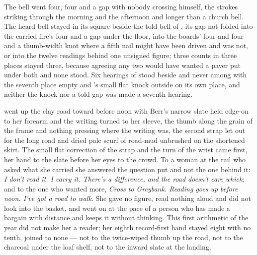 \scenebreak

The bell went four, four and a gap with nobody crossing himself, the strokes striking through the morning and the afternoon and longer than a church bell. The heard bell stayed in its square beside the told bell of , its gap not folded into the carried fire's four and a gap under the floor, into the boards' four and four and a thumb-width knot where a fifth nail might have been driven and was not, or into the twelve readings behind one unsigned figure; three counts in three places stayed three, because agreeing any two would have wanted a payer put under both and none stood. Six hearings of  stood beside and never among with the seventh place empty and 's small flat knock outside on its own place, and neither the knock nor a told gap was made a seventh hearing.

 went up the clay road toward  before noon with Berr's narrow slate held edge-on to her forearm and the writing turned to her sleeve, the thumb along the grain of the frame and nothing pressing where the writing was, the second strap let out for the long road and dried pale scurf of road-mud unbrushed on the shortened skirt. The small flat correction of the strap and the turn of the wrist came first, her hand to the slate before her eyes to the crowd. To a woman at the rail who asked what she carried she answered the question put and not the one behind it: \emph{I don't read it. I carry it. There's a difference, and the road doesn't care which}; and to the one who wanted more, \emph{Cross to Greybank. Reading goes up before noon. I've got a road to walk}. She gave no figure, read nothing aloud and did not look into the basket, and went on at the pace of a person who has made a bargain with distance and keeps it without thinking. This first arithmetic of the year did not make her a reader; her eighth record-first hand stayed eight with no tenth, joined to none --- not to the twice-wiped thumb up the road, not to the charcoal under the loaf shelf, not to the inward slate at the landing.

